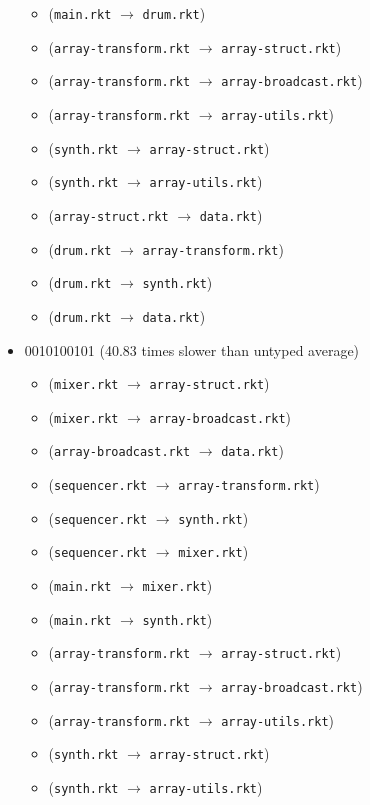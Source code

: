 \documentclass{article}
\newcommand{\mono}[1]{\texttt{#1}}
\begin{document}
\begin{itemize}
\begin{itemize}
  \item (\mono{main.rkt} $\rightarrow$ \mono{drum.rkt})
  \item (\mono{array-transform.rkt} $\rightarrow$ \mono{array-struct.rkt})
  \item (\mono{array-transform.rkt} $\rightarrow$ \mono{array-broadcast.rkt})
  \item (\mono{array-transform.rkt} $\rightarrow$ \mono{array-utils.rkt})
  \item (\mono{synth.rkt} $\rightarrow$ \mono{array-struct.rkt})
  \item (\mono{synth.rkt} $\rightarrow$ \mono{array-utils.rkt})
  \item (\mono{array-struct.rkt} $\rightarrow$ \mono{data.rkt})
  \item (\mono{drum.rkt} $\rightarrow$ \mono{array-transform.rkt})
  \item (\mono{drum.rkt} $\rightarrow$ \mono{synth.rkt})
  \item (\mono{drum.rkt} $\rightarrow$ \mono{data.rkt})
  \end{itemize}
\item 0010100101 (40.83 times slower than untyped average)
  \begin{itemize}
  \item (\mono{mixer.rkt} $\rightarrow$ \mono{array-struct.rkt})
  \item (\mono{mixer.rkt} $\rightarrow$ \mono{array-broadcast.rkt})
  \item (\mono{array-broadcast.rkt} $\rightarrow$ \mono{data.rkt})
  \item (\mono{sequencer.rkt} $\rightarrow$ \mono{array-transform.rkt})
  \item (\mono{sequencer.rkt} $\rightarrow$ \mono{synth.rkt})
  \item (\mono{sequencer.rkt} $\rightarrow$ \mono{mixer.rkt})
  \item (\mono{main.rkt} $\rightarrow$ \mono{mixer.rkt})
  \item (\mono{main.rkt} $\rightarrow$ \mono{synth.rkt})
  \item (\mono{array-transform.rkt} $\rightarrow$ \mono{array-struct.rkt})
  \item (\mono{array-transform.rkt} $\rightarrow$ \mono{array-broadcast.rkt})
  \item (\mono{array-transform.rkt} $\rightarrow$ \mono{array-utils.rkt})
  \item (\mono{synth.rkt} $\rightarrow$ \mono{array-struct.rkt})
  \item (\mono{synth.rkt} $\rightarrow$ \mono{array-utils.rkt})

\end{itemize}
\end{itemize}
\end{document}
